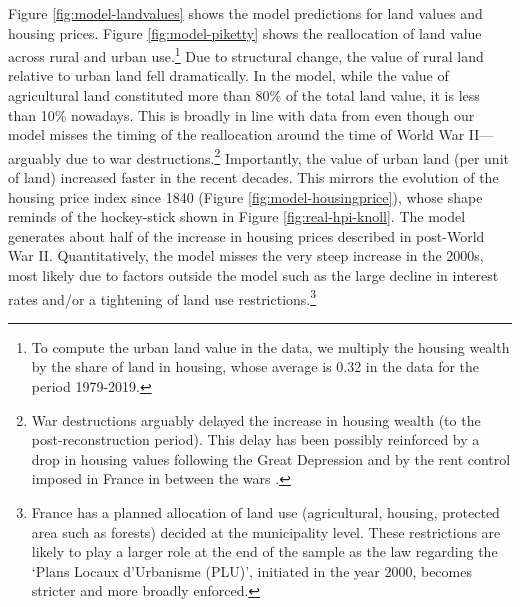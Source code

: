 \documentclass[./20250130-paper.tex]{subfiles}
\begin{document}



 Figure \ref{fig:model-landvalues} shows the model predictions for land values and housing prices. Figure \ref{fig:model-piketty} shows the reallocation of land value across rural and urban use.\footnote{To compute the urban land value in the data, we multiply the housing wealth by the share of land in housing, whose average is 0.32 in the data for the period 1979-2019.} Due to structural change, the value of rural land relative to urban land fell dramatically. In the model, while the value of agricultural land constituted more than 80\% of the total land value, it is less than 10\% nowadays. This is broadly in line with data from \cite{piketty2014capital} even though our model misses the timing of the reallocation around the time of World War II---arguably due to war destructions.\footnote{War destructions arguably delayed the increase in housing wealth (to the post-reconstruction period). This delay has been possibly reinforced by a drop in housing values following the Great Depression and by the rent control imposed in France in between the wars .} Importantly, the value of urban land (per unit of land) increased faster in the recent decades. This mirrors the evolution of the housing price index since 1840 (Figure \ref{fig:model-housingprice}), whose shape reminds of the hockey-stick shown in Figure \ref{fig:real-hpi-knoll}. The model generates about half of the increase in housing prices described in \cite{knoll2017no} post-World War II. Quantitatively, the model misses the very steep increase in the 2000s, most likely due to factors outside the model such as the large decline in interest rates and/or a tightening of land use restrictions.\footnote{France has a planned allocation of land use (agricultural, housing, protected area such as forests) decided at the municipality level. These restrictions are likely to play a larger role at the end of the sample as the law regarding the `Plans Locaux d'Urbanisme (PLU)', initiated in the year 2000, becomes stricter and more broadly enforced.}
\end{document}
